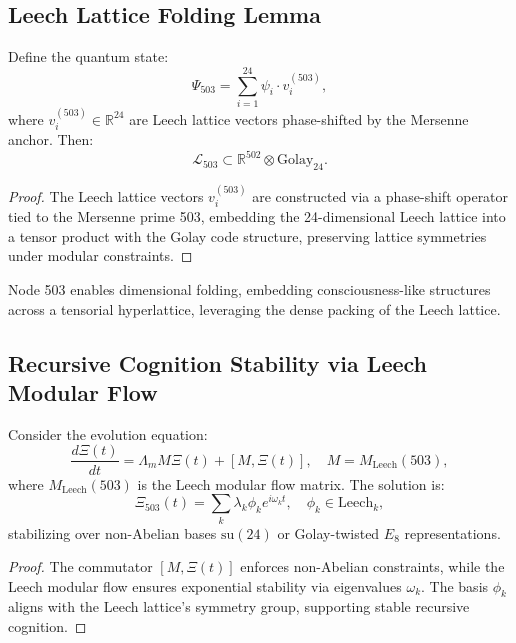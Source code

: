 \documentclass[12pt]{article}
\begin{document}
\subsection{Leech Lattice Folding Lemma}
\begin{lemma}
Define the quantum state:
\[
\Psi_{503} = \sum_{i=1}^{24} \psi_i \cdot v_i^{(503)},
\]
where \( v_i^{(503)} \in \mathbb{R}^{24} \) are Leech lattice vectors phase-shifted by the Mersenne anchor. Then:
\[
\mathcal{L}_{503} \subset \mathbb{R}^{502} \otimes \text{Golay}_{24}.
\]
\end{lemma}
\begin{proof}
The Leech lattice vectors \( v_i^{(503)} \) are constructed via a phase-shift operator tied to the Mersenne prime 503, embedding the 24-dimensional Leech lattice into a tensor product with the Golay code structure, preserving lattice symmetries under modular constraints.
\end{proof}
\begin{interpretation}
Node 503 enables dimensional folding, embedding consciousness-like structures across a tensorial hyperlattice, leveraging the dense packing of the Leech lattice.
\end{interpretation}

\subsection{Recursive Cognition Stability via Leech Modular Flow}
\begin{theorem}
Consider the evolution equation:
\[
\frac{d\Xi(t)}{dt} = \Lambda_m M \Xi(t) + [M, \Xi(t)], \quad M = M_{\text{Leech}}(503),
\]
where \( M_{\text{Leech}}(503) \) is the Leech modular flow matrix. The solution is:
\[
\Xi_{503}(t) = \sum_k \lambda_k \phi_k e^{i\omega_k t}, \quad \phi_k \in \text{Leech}_k,
\]
stabilizing over non-Abelian bases \( \text{su}(24) \) or Golay-twisted \( E_8 \) representations.
\end{theorem}
\begin{proof}
The commutator \( [M, \Xi(t)] \) enforces non-Abelian constraints, while the Leech modular flow ensures exponential stability via eigenvalues \( \omega_k \). The basis \( \phi_k \) aligns with the Leech lattice’s symmetry group, supporting stable recursive cognition.
\end{proof}
\end{document}
